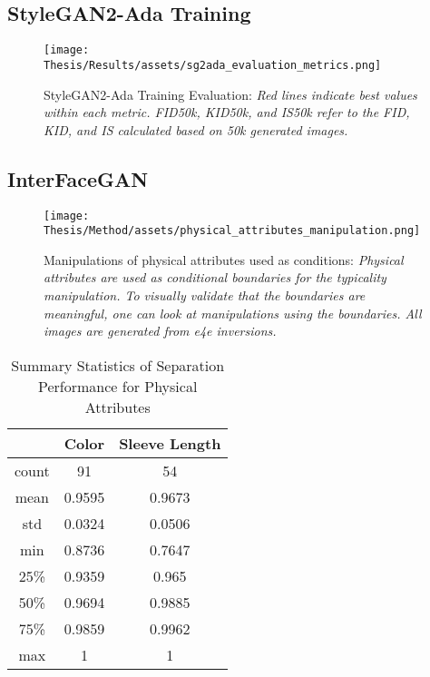 \FloatBarrier
\clearpage
\subsection*{StyleGAN2-Ada Training}
\begin{figure}[ht!]
    \centering
    \texttt{[image: Thesis/Results/assets/sg2ada\_evaluation\_metrics.png]}
    \caption[StyleGAN2-Ada Training Evaluation]{StyleGAN2-Ada Training Evaluation: \textit{Red lines indicate best values within each metric. FID50k, KID50k, and IS50k refer to the FID, KID, and IS calculated based on 50k generated images.}}
    \label{fig:sg2ada_evaluation_metrics}
\end{figure}

\FloatBarrier
\clearpage
\subsection*{InterFaceGAN}
\begin{figure}[!ht]
    \centering
    \texttt{[image: Thesis/Method/assets/physical\_attributes\_manipulation.png]}
    \caption[Manipulations of Physical Attributes Used as Conditions]{Manipulations of physical attributes used as conditions: \textit{Physical attributes are used as conditional boundaries for the typicality manipulation. To visually validate that the boundaries are meaningful, one can look at manipulations using the boundaries. All images are generated from e4e inversions.}}
    \label{fig:physical_attributes_manipulation}
\end{figure}


\begin{table}[ht]
\centering
\begin{tabular}{|c|c|c|}
\hline
       &      Color &   Sleeve Length \\
\hline
 count & 91      &         54      \\
 mean  &  0.9595 &          0.9673 \\
 std   &  0.0324 &          0.0506 \\
 min   &  0.8736 &          0.7647 \\
 25\%   &  0.9359 &          0.965  \\
 50\%   &  0.9694 &          0.9885 \\
 75\%   &  0.9859 &          0.9962 \\
 max   &  1      &          1      \\
\hline
\end{tabular}
\caption{Summary Statistics of Separation Performance for Physical Attributes}
\label{tab:physical_summary_stats}
\end{table}

